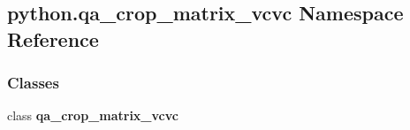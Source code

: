 \subsection{python.\+qa\+\_\+crop\+\_\+matrix\+\_\+vcvc Namespace Reference}
\label{namespacepython_1_1qa__crop__matrix__vcvc}
\subsubsection*{Classes}
\begin{DoxyCompactItemize}
\item 
class {\bf qa\+\_\+crop\+\_\+matrix\+\_\+vcvc}
\end{DoxyCompactItemize}
